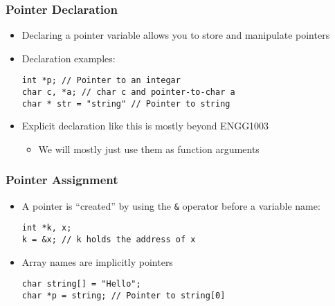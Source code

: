 \documentclass[14pt]{beamer}
\begin{document}
\begin{frame}[fragile]
\frametitle{Pointer Declaration}
\begin{itemize}
\item Declaring a pointer variable allows you to store and manipulate pointers
\item Declaration examples:
\begin{lstlisting}[style=CStyle]
int *p; // Pointer to an integar
char c, *a; // char c and pointer-to-char a
char * str = "string" // Pointer to string
\end{lstlisting}
\item Explicit declaration like this is mostly beyond ENGG1003
	\begin{itemize}
		\item We will mostly just use them as function arguments
	\end{itemize}
\end{itemize}
\end{frame}

\begin{frame}[fragile]
\frametitle{Pointer Assignment}
\begin{itemize}
\item A pointer is ``created'' by using the \texttt{\&} operator before a variable name:
\begin{lstlisting}[style=CStyle]
int *k, x;
k = &x; // k holds the address of x
\end{lstlisting}
\item Array names are implicitly pointers
\begin{lstlisting}[style=CStyle]
char string[] = "Hello";
char *p = string; // Pointer to string[0]
\end{lstlisting}
\end{itemize}
\end{frame}
\end{document}
